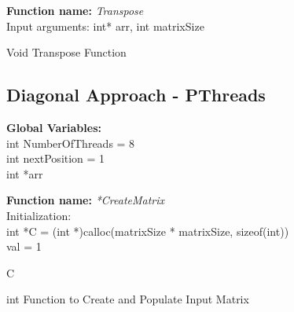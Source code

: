 \documentclass[10pt,journal]{article}
\begin{document}
\begin{algorithm}[H]
\SetAlgoLined
\textbf{Function name:} \emph{Transpose}\\
Input arguments:\: int* arr, int matrixSize \\

\vspace{10pt} 

\caption{Void Transpose Function}
\end{algorithm}

\newpage
\subsection{Diagonal Approach - PThreads}
\textbf{Global Variables:} \\
int NumberOfThreads = 8\\
int nextPosition = 1\\
int *arr\\

\begin{algorithm}[H]
\SetAlgoLined
\textbf{Function name:} \emph{*CreateMatrix}\\
Initialization\::\\
int *C = (int *)calloc(matrixSize * matrixSize, sizeof(int))\\
val = 1

\vspace{10pt} 
\Return C
\caption{int Function to Create and Populate Input Matrix}
\end{algorithm}
\end{document}
